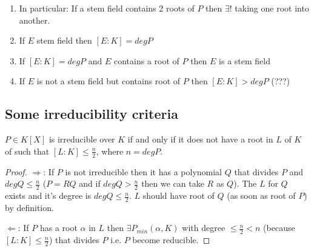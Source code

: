 \begin{remark}
  \begin{enumerate}
  \item In particular: If a stem field contains 2 roots of $P$ then
    $\exists!$  taking one root into
    another.
  \item If $E$ stem field then $\left[E:K\right] = deg P$
  \item If $\left[E:K\right] = deg P$ and $E$ contains a root of $P$
    then $E$ is a stem field
  \item If $E$ is not a stem field but contains root of $P$ then
    $\left[E:K\right] > deg P$ (???)
  \end{enumerate}
  \label{rem:lec2_1}
\end{remark}

\subsection{Some irreducibility criteria}

\begin{corollary}
  $P \in K\left[X\right]$ is irreducible over $K$ if and only if it
  does not have a root in  $L$ of $K$ of such that
  $\left[L:K\right] \le \frac{n}{2}$, where $n = deg P$.
  \label{cor:lec2_1}
  \begin{proof}
    $\Rightarrow$: If $P$ is not irreducible then it has a polynomial $Q$ that
    divides $P$ and $deg Q \le \frac{n}{2}$ ($P = RQ$ and if
    $deg Q > \frac{n}{2}$ then we can take $R$ as $Q$). The
     $L$ for $Q$ exists and it's degree is $deg Q
    \le \frac{n}{2}$. $L$ should have root of $Q$ (as soon as root of
    $P$) by definition.

    $\Leftarrow$: If $P$ has a root $\alpha$ in $L$ then $\exists
    P_{min}\left(\alpha, K\right)$ with degree
    $\le \frac{n}{2} < n$ (because $\left[L:K\right] \le \frac{n}{2}$)
    that divides $P$ i.e. $P$ become reducible.
  \end{proof}
\end{corollary}

